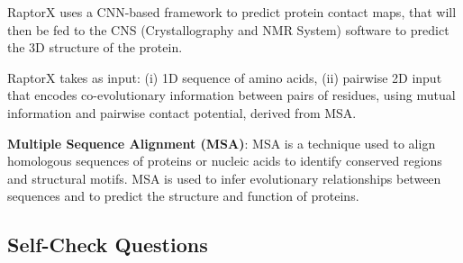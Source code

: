 \documentclass[a4paper]{article}
\begin{document}
RaptorX uses a CNN-based framework to predict protein contact maps, that 
will then be fed to the CNS (Crystallography and NMR System) software to
predict the 3D structure of the protein.

RaptorX takes as input: (i) 1D sequence of amino acids, (ii) pairwise
2D input that encodes co-evolutionary information between pairs of residues, using
mutual information and pairwise contact potential, derived from MSA.

\textbf{Multiple Sequence Alignment (MSA)}: MSA is a technique used to align
homologous sequences of proteins or nucleic acids to identify conserved regions
and structural motifs. MSA is used to infer evolutionary relationships between
sequences and to predict the structure and function of proteins.

\subsection*{Self-Check Questions}
\end{document}
